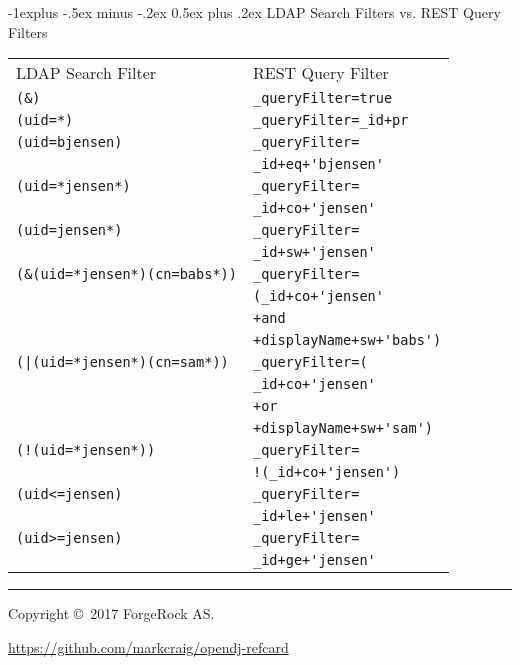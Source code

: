 \documentclass[10pt,landscape]{article}
\makeatletter
\renewcommand{\subsection}{\@startsection{subsection}{2}{0mm}%
                                {-1explus -.5ex minus -.2ex}%
                                {0.5ex plus .2ex}%
                                {\normalfont\small\bfseries}}
\makeatother
\begin{document}
\begin{multicols}{3}
\subsection{LDAP Search Filters vs. REST Query Filters}
\begin{tabular}{@{}ll@{}}
LDAP Search Filter                 & REST Query Filter \\
\verb!(&)!                         & \lstinline!_queryFilter=true! \\
\verb!(uid=*)!                     & \lstinline!_queryFilter=_id+pr! \\
\verb!(uid=bjensen)!               & \lstinline!_queryFilter=! \\
                                   & \lstinline!_id+eq+'bjensen'! \\
\verb!(uid=*jensen*)!              & \lstinline!_queryFilter=! \\
                                   & \lstinline!_id+co+'jensen'! \\
\verb!(uid=jensen*)!               & \lstinline!_queryFilter=! \\
                                   & \lstinline!_id+sw+'jensen'! \\
\verb!(&(uid=*jensen*)(cn=babs*))! & \lstinline!_queryFilter=! \\
                                   & \lstinline!(_id+co+'jensen'! \\
                                   & \lstinline!+and! \\
                                   & \lstinline!+displayName+sw+'babs')! \\
\verb!(|(uid=*jensen*)(cn=sam*))!  & \lstinline!_queryFilter=(! \\
                                   & \lstinline!_id+co+'jensen'! \\
                                   & \lstinline!+or! \\
                                   & \lstinline!+displayName+sw+'sam')! \\
\verb$(!(uid=*jensen*))$           & \lstinline!_queryFilter=! \\
                                   & \lstinline$!(_id+co+'jensen')$ \\
\verb!(uid<=jensen)!               & \lstinline!_queryFilter=! \\
                                   & \lstinline!_id+le+'jensen'! \\
\verb!(uid>=jensen)!               & \lstinline!_queryFilter=! \\
                                   & \lstinline!_id+ge+'jensen'!
\end{tabular}

\rule{0.3\linewidth}{0.25pt}
\scriptsize

Copyright \copyright\ 2017 ForgeRock AS.

\href{https://github.com/markcraig/opendj-refcard}{https://github.com/markcraig/opendj-refcard}

\end{multicols}
\end{document}
